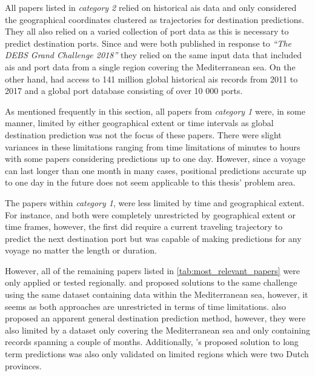 All papers listed in \textit{category 2} relied on historical \acrshort{ais} data and only considered the geographical coordinates clustered as trajectories for destination predictions. They all also relied on a varied collection of port data as this is necessary to predict destination ports. Since \cite{Rosca2018GrandRoutes} and \cite{Bachar2018GrandDestination} were both published in response to \textit{``The DEBS Grand Challenge 2018''} they relied on the same input data that included \acrshort{ais} and port data from a single region covering the Mediterranean sea. On the other hand, \cite{Zhang2020AISApproach} had access to 141 million global historical \acrshort{ais} records from 2011 to 2017 and a global port database consisting of over 10 000 ports.


As mentioned frequently in this section, all papers from \textit{category 1} were, in some manner, limited by either geographical extent or time intervals as global destination prediction was not the focus of these papers. There were slight variances in these limitations ranging from time limitations of minutes to hours with some papers considering predictions up to one day. However, since a voyage can last longer than one month in many cases, positional predictions accurate up to one day in the future does not seem applicable to this thesis' problem area.

The papers within \textit{category 1}, were less limited by time and geographical extent. For instance, \cite{Zhang2020AISApproach} and \cite{lechtenberg2019} both were completely unrestricted by geographical extent or time frames, however, the first did require a current traveling trajectory to predict the next destination port but was capable of making predictions for any voyage no matter the length or duration.

However, all of the remaining papers listed in \cref{tab:most_relevant_papers} were only applied or tested regionally. \cite{Rosca2018GrandRoutes} and \cite{Bachar2018GrandDestination} proposed solutions to the same challenge using the same dataset containing data within the Mediterranean sea, however, it seems as both approaches are unrestricted in terms of time limitations. \cite{Karatas2020TrajectoryData} also proposed an apparent general destination prediction method, however, they were also limited by a dataset only covering the Mediterranean sea and only containing records spanning a couple of months. Additionally, \cite{Dobrkovic2018MaritimeData}'s proposed solution to long term predictions was also only validated on limited regions which were two Dutch provinces.


